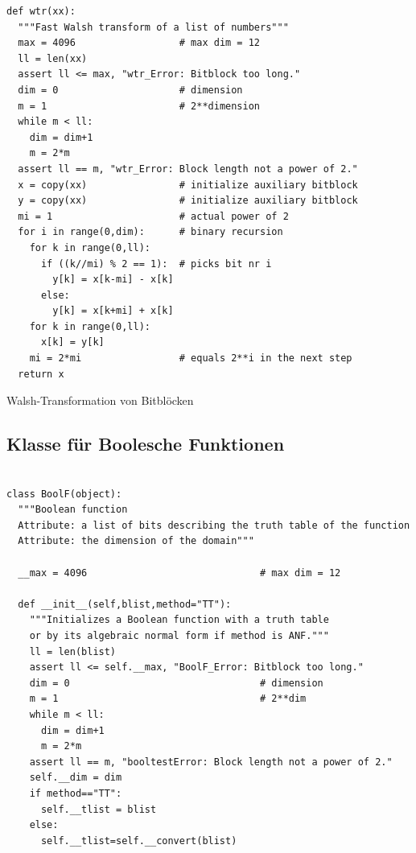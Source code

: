 \begin{refsegment}
\begin{sagecode}
\begin{verbatim}
def wtr(xx):
  """Fast Walsh transform of a list of numbers"""
  max = 4096                  # max dim = 12
  ll = len(xx)
  assert ll <= max, "wtr_Error: Bitblock too long."
  dim = 0                     # dimension
  m = 1                       # 2**dimension
  while m < ll:
    dim = dim+1
    m = 2*m
  assert ll == m, "wtr_Error: Block length not a power of 2."
  x = copy(xx)                # initialize auxiliary bitblock
  y = copy(xx)                # initialize auxiliary bitblock
  mi = 1                      # actual power of 2
  for i in range(0,dim):      # binary recursion
    for k in range(0,ll):
      if ((k//mi) % 2 == 1):  # picks bit nr i
        y[k] = x[k-mi] - x[k]
      else:
        y[k] = x[k+mi] + x[k]
    for k in range(0,ll):
      x[k] = y[k]
    mi = 2*mi                 # equals 2**i in the next step
  return x
\end{verbatim}
\caption{Walsh-Transformation
   von Bitblöcken}\label{Sage-code-bool-walsh}
\end{sagecode}
\newpage

\subsection{Klasse für Boolesche
  Funktionen}\label{ss-bool-class}

\begin{sagecode}
\begin{verbatim}

class BoolF(object):
  """Boolean function
  Attribute: a list of bits describing the truth table of the function
  Attribute: the dimension of the domain"""

  __max = 4096                              # max dim = 12

  def __init__(self,blist,method="TT"):
    """Initializes a Boolean function with a truth table
    or by its algebraic normal form if method is ANF."""
    ll = len(blist)
    assert ll <= self.__max, "BoolF_Error: Bitblock too long."
    dim = 0                                 # dimension
    m = 1                                   # 2**dim
    while m < ll:
      dim = dim+1
      m = 2*m
    assert ll == m, "booltestError: Block length not a power of 2."
    self.__dim = dim
    if method=="TT":
      self.__tlist = blist
    else:
      self.__tlist=self.__convert(blist)


\end{verbatim}
\end{sagecode}
\end{refsegment}
